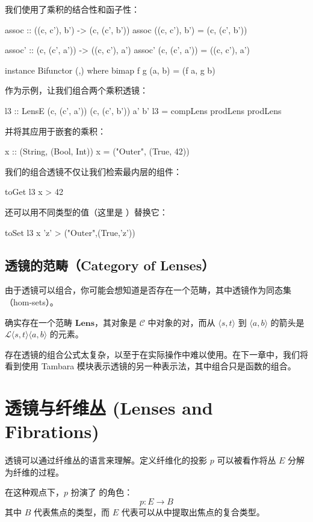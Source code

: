 \documentclass[DaoFP]{subfiles}
\begin{document}
 我们使用了乘积的结合性和函子性：
 \begin{haskell}
  assoc :: ((c, c'), b') -> (c, (c', b'))
  assoc ((c, c'), b') = (c, (c', b'))

  assoc' :: (c, (c', a')) -> ((c, c'), a')
  assoc' (c, (c', a')) = ((c, c'), a')

  instance Bifunctor (,) where
  bimap f g (a, b) = (f a, g b)
 \end{haskell}

 作为示例，让我们组合两个乘积透镜：
 \begin{haskell}
  l3 :: LensE (c, (c', a')) (c, (c', b')) a' b'
  l3 = compLens prodLens prodLens
 \end{haskell}
 并将其应用于嵌套的乘积：
 \begin{haskell}
  x :: (String, (Bool, Int))
  x = ("Outer", (True, 42))
 \end{haskell}
 我们的组合透镜不仅让我们检索最内层的组件：
 \begin{haskell}
  toGet l3 x
  > 42
 \end{haskell}
 还可以用不同类型的值（这里是 ）替换它：
 \begin{haskell}
  toSet l3 x 'z'
  > ("Outer",(True,'z'))
 \end{haskell}

 \subsection{透镜的范畴（Category of Lenses）}

 由于透镜可以组合，你可能会想知道是否存在一个范畴，其中透镜作为同态集（hom-sets）。

 确实存在一个范畴 $\mathbf{Lens}$，其对象是 $\mathcal{C}$ 中对象的对，而从 $\langle s, t\rangle$ 到 $ \langle a, b \rangle$ 的箭头是 $\mathcal{L} \langle s, t\rangle \langle a, b \rangle$ 的元素。

 存在透镜的组合公式太复杂，以至于在实际操作中难以使用。在下一章中，我们将看到使用 Tambara 模块表示透镜的另一种表示法，其中组合只是函数的组合。

 \section{透镜与纤维丛 (Lenses and Fibrations)}

 透镜可以通过纤维丛的语言来理解。定义纤维化的投影 $p$ 可以被看作将丛 $E$ 分解为纤维的过程。

 在这种观点下，$p$ 扮演了  的角色：
 \[ p \colon E \to B \]
 其中 $B$ 代表焦点的类型，而 $E$ 代表可以从中提取出焦点的复合类型。
\end{document}

